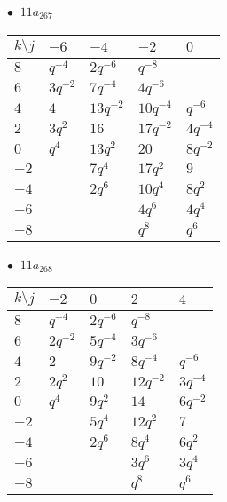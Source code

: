 \begin{minipage}{\linewidth}
$\bullet\ $ $11a_{267}$ \vspace{0.5em} \\
\begin{tabular}{l|llll}
$k \setminus j$ & $-6$ & $-4$ & $-2$ & $0$ \\
\hline
$8$ & $q^{-4}$ & $2q^{-6}$ & $q^{-8}$ &  \\
$6$ & $3q^{-2}$ & $7q^{-4}$ & $4q^{-6}$ &  \\
$4$ & $4$ & $13q^{-2}$ & $10q^{-4}$ & $q^{-6}$ \\
$2$ & $3q^{2}$ & $16$ & $17q^{-2}$ & $4q^{-4}$ \\
$0$ & $q^{4}$ & $13q^{2}$ & $20$ & $8q^{-2}$ \\
$-2$ &  & $7q^{4}$ & $17q^{2}$ & $9$ \\
$-4$ &  & $2q^{6}$ & $10q^{4}$ & $8q^{2}$ \\
$-6$ &  &  & $4q^{6}$ & $4q^{4}$ \\
$-8$ &  &  & $q^{8}$ & $q^{6}$ \\
\end{tabular}
\vspace{2em}
\end{minipage}
%
\begin{minipage}{\linewidth}
$\bullet\ $ $11a_{268}$ \vspace{0.5em} \\
\begin{tabular}{l|llll}
$k \setminus j$ & $-2$ & $0$ & $2$ & $4$ \\
\hline
$8$ & $q^{-4}$ & $2q^{-6}$ & $q^{-8}$ &  \\
$6$ & $2q^{-2}$ & $5q^{-4}$ & $3q^{-6}$ &  \\
$4$ & $2$ & $9q^{-2}$ & $8q^{-4}$ & $q^{-6}$ \\
$2$ & $2q^{2}$ & $10$ & $12q^{-2}$ & $3q^{-4}$ \\
$0$ & $q^{4}$ & $9q^{2}$ & $14$ & $6q^{-2}$ \\
$-2$ &  & $5q^{4}$ & $12q^{2}$ & $7$ \\
$-4$ &  & $2q^{6}$ & $8q^{4}$ & $6q^{2}$ \\
$-6$ &  &  & $3q^{6}$ & $3q^{4}$ \\
$-8$ &  &  & $q^{8}$ & $q^{6}$ \\
\end{tabular}
\vspace{2em}
\end{minipage}
%
